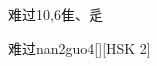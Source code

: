 \begin{entry}{难过}{10,6}{⾫、⾡}
  \begin{phonetics}{难过}{nan2guo4}[][HSK 2]
  \end{phonetics}
\end{entry}
